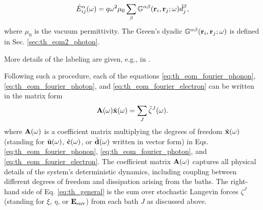 \begin{equation}
 \tilde{E}_{ij}^{\alpha}(\omega) = q\omega^2 \mu_0 \sum_{\beta} \mathbb{G}^{\alpha\beta}(\mathbf{r}_i,\mathbf{r}_j;\omega)\tilde{d}_j^{\beta}, \label{eq:th_Eij}
\end{equation}
where $\mu_0$ is the vacuum permittivity. The Green's dyadic $\mathbb{G}^{\alpha\beta}(\mathbf{r}_i,\mathbf{r}_j;\omega)$ is defined in Sec. \ref{sec:th_eom2_photon}. %

 More details of the labeling are given, e.g., in .

Following such a procedure, each of the equations \eqref{eq:th_eom_fourier_phonon}, \eqref{eq:th_eom_fourier_photon}, and \eqref{eq:th_eom_fourier_electron} can be written in the matrix form
\begin{equation}
 \mathbf{A}(\omega) \tilde{\mathbf{x}}(\omega) = \sum_J \tilde \zeta^J(\omega). \label{eq:th_general}
\end{equation}
where $\mathbf{A}(\omega)$ is a coefficient matrix multiplying the degrees of freedom $\tilde{\mathbf{x}}(\omega)$ (standing for $\tilde{\mathbf{u}}(\omega)$, $\tilde{\mathbf{c}}(\omega)$, or $\tilde{\mathbf{d}}(\omega)$ written in vector form) in Eqs. \eqref{eq:th_eom_fourier_phonon}, \eqref{eq:th_eom_fourier_photon}, and \eqref{eq:th_eom_fourier_electron}. The coefficient matrix $\mathbf{A}(\omega)$ captures all physical details of the system's deterministic dynamics, including coupling between different degrees of freedom and dissipation arising from the baths. The right-hand side of Eq. \eqref{eq:th_general} is the sum over stochastic Langevin forces $\zeta^J$ (standing for $\xi$, $\eta$, or $\mathbf{E}_{\textrm{env}}$) from each bath $J$ as discussed above.  %

